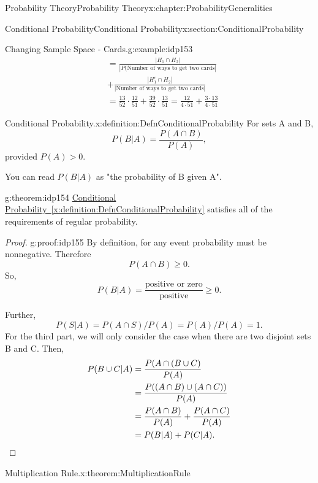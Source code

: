 \documentclass[oneside,10pt,]{book}
\newcommand{\xreffont}{\relax}
\newcommand{\qedhere}{\relax}
\numberwithin{equation}{section}
\newcommand{\gt}{>}
\begin{document}
\begin{chapterptx}{Probability Theory}{}{Probability Theory}{}{}{x:chapter:ProbabilityGeneralities}
\begin{sectionptx}{Conditional Probability}{}{Conditional Probability}{}{}{x:section:ConditionalProbability}
\begin{example}{Changing Sample Space - Cards.}{g:example:idp153}
\begin{align*}
& = \frac{ | H_1 \cap H_2 |}{| P( \text{Number of ways to get two cards} | }\\
& + \frac{ | H_1^c \cap H_2 | }{ | \text{Number of ways to get two cards} | }\\
& = \frac{13}{52} \cdot \frac{12}{51} + \frac{39}{52} \cdot \frac{13}{51} = \frac{12}{4 \cdot 51} + \frac{3 \cdot 13}{4 \cdot 51}	
\end{align*}
%
\end{example}
\begin{definition}{Conditional Probability.}{x:definition:DefnConditionalProbability}%
For sets A and B,%
\begin{equation*}
P(B | A) = \frac{P(A \cap B)}{ P(A) },
\end{equation*}
provided \(P(A) \gt 0\).%
\end{definition}
You can read \(P(B|A)\) as "the probability of B given A".%
\begin{theorem}{}{}{g:theorem:idp154}%
\hyperref[x:definition:DefnConditionalProbability]{Conditional Probability~{\xreffont\ref{x:definition:DefnConditionalProbability}}} satisfies all of the requirements of regular probability.%
\end{theorem}
\begin{proof}{}{g:proof:idp155}
By definition, for any event probability must be nonnegative. Therefore%
\begin{equation*}
P(A \cap B) \ge 0.
\end{equation*}
So,%
\begin{equation*}
P(B | A) = \frac{\text{positive or zero}}{\text{positive}}\ge 0.
\end{equation*}
%
\par
Further,%
\begin{equation*}
P (S | A) = P(A \cap S)/P(A) = P(A)/P(A) = 1.
\end{equation*}
For the third part, we will only consider the case when there are two disjoint sets B and C.  Then,%
\begin{align*}
P(B \cup C | A) & = \frac{P(A \cap (B \cup C)}{P(A)} \\
& = \frac{P( (A \cap B) \cup (A \cap C) )}{P(A)}\\
& = \frac{P(A \cap B)}{P(A)} + \frac{P(A \cap C)}{P(A)}\\
& = P(B | A) + P(C | A).\qedhere
\end{align*}
%
\end{proof}
\begin{theorem}{Multiplication Rule.}{}{x:theorem:MultiplicationRule}%

\end{theorem}
\end{sectionptx}
\end{chapterptx}
\end{document}
